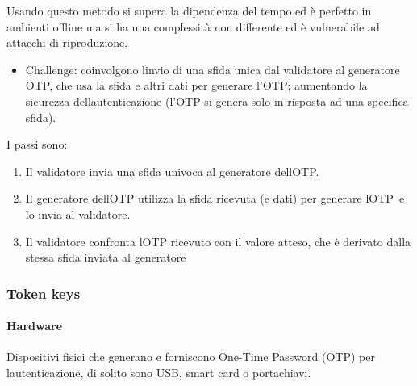 \documentclass[
]{article}
\providecommand{\tightlist}{%
  \setlength{\itemsep}{0pt}\setlength{\parskip}{0pt}}
\begin{document}
{Usando questo metodo si supera la dipendenza del tempo ed è perfetto in
ambienti offline ma si ha una complessità non differente ed è
vulnerabile ad attacchi di riproduzione.}

{}

\begin{itemize}
\tightlist
\item
  {Challenge}{: }{coinvolgono l\textquotesingle invio di una sfida unica
  dal validatore al generatore OTP, che usa la sfida e altri dati per
  generare l'OTP; aumentando la sicurezza
  dell\textquotesingle autenticazione (l'OTP si genera solo in risposta
  ad una specifica sfida).}
\end{itemize}

{I passi sono:}

\begin{enumerate}
\tightlist
\item
  {Il validatore invia una sfida univoca al generatore
  dell\textquotesingle OTP.}
\end{enumerate}

{}

\begin{enumerate}
\setcounter{enumi}{1}
\tightlist
\item
  {Il generatore dell\textquotesingle OTP utilizza la sfida ricevuta (e
  dati) per generare }{l\textquotesingle OTP}{~e lo invia al
  validatore.}
\end{enumerate}

{}

\begin{enumerate}
\setcounter{enumi}{2}
\tightlist
\item
  {Il validatore confronta l\textquotesingle OTP ricevuto con il valore
  atteso, che è derivato dalla stessa sfida inviata al generatore}
\end{enumerate}

\subsubsection{\texorpdfstring{{Token
keys}}{Token keys}}\label{h.2rs4l8p5d9a0}

\paragraph{\texorpdfstring{{Hardware}}{Hardware}}\label{h.symgda6sx6l1}

{Dispositivi fisici che generano e forniscono One-Time Password (OTP)
per l\textquotesingle autenticazione, di solito sono USB, smart card o
portachiavi.}
\end{document}
